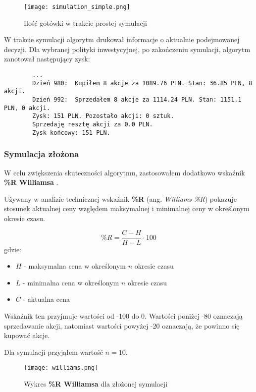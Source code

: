\documentclass{article}
\begin{document}
    \begin{figure}[H]
        \texttt{[image: simulation\_simple.png]}
        \centering
        \caption{Ilość gotówki w trakcie prostej symulacji}
    \end{figure}

    W trakcie symulacji algorytm drukował informacje o aktualnie podejmowanej decyzji.
    Dla wybranej polityki inwestycyjnej, po zakończeniu symulacji, algorytm zanotował następujący zysk:
    \begin{verbatim}
        ...
        Dzień 980:  Kupiłem 8 akcje za 1089.76 PLN. Stan: 36.85 PLN, 8 akcji.
        Dzień 992:  Sprzedałem 8 akcje za 1114.24 PLN. Stan: 1151.1 PLN, 0 akcji.
        Zysk: 151 PLN. Pozostało akcji: 0 sztuk.
        Sprzedaję resztę akcji za 0.0 PLN.
        Zysk końcowy: 151 PLN.
    \end{verbatim}

    \subsubsection{Symulacja złożona}

    W celu zwiększenia skuteczności algorytmu, zastosowałem dodatkowo wskaźnik \textbf{\%R Williamsa} \cite{wiki1}\cite{williams}.

    Używany w analizie technicznej wskaźnik \textbf{\%R} (ang. \textit{Williams \%R})
    pokazuje stosunek aktualnej ceny względem maksymalnej i minimalnej ceny w określonym okresie czasu.

    \begin{equation}
        \%R = \frac{C - H}{H - L} \cdot 100
    \end{equation}
    gdzie:
    \begin{itemize}
        \item $H$ - maksymalna cena w określonym $n$ okresie czasu
        \item $L$ - minimalna cena w określonym $n$ okresie czasu
        \item $C$ - aktualna cena
    \end{itemize}

    Wskaźnik ten przyjmuje wartości od -100 do 0.
    Wartości poniżej -80 oznaczają sprzedawanie akcji,
    natomiast wartości powyżej -20 oznaczają, że powinno się kupować akcje.

    Dla symulacji przyjąłem wartość $n = 10$.

    \begin{figure}[H]
        \texttt{[image: williams.png]}
        \centering
        \caption{Wykres \textbf{\%R Williamsa} dla złożonej symulacji}
    \end{figure}
\end{document}
